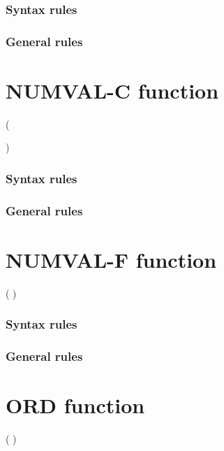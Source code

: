 \subsubsection{Syntax rules}

\subsubsection{General rules}

\section{NUMVAL-C function}

\begin{syntax}
    ( \argument
  \begin{0-1}
    \argument
  \end{0-1}
  )
\end{syntax}

\subsubsection{Syntax rules}

\subsubsection{General rules}

\section{NUMVAL-F function}

\begin{syntax}
    ( \argument )
\end{syntax}

\subsubsection{Syntax rules}

\subsubsection{General rules}

\section{ORD function}

\begin{syntax}
    ( \argument )
\end{syntax}

